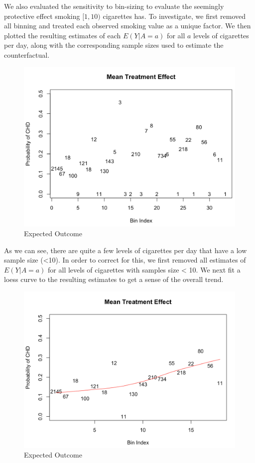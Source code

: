 \documentclass[]{article}
\begin{document}
We also evaluated the sensitivity to bin-sizing to evaluate the
seemingly protective effect smoking \([1, 10)\) cigarettes has. To
investigate, we first removed all binning and treated each observed
smoking value as a unique factor. We then plotted the resulting
estimates of each \(E(Y | A=a)\) for all \(a\) levels of cigarettes per
day, along with the corresponding sample sizes used to estimate the
counterfactual.

\begin{figure}[H]

{\centering \includegraphics[width=0.5\linewidth]{./effect} 

}

\caption{Expected Outcome}\label{fig:fig5}
\end{figure}

As we can see, there are quite a few levels of cigarettes per day that
have a low sample size (\textless{}10). In order to correct for this, we
first removed all estimates of \(E(Y | A=a )\) for all levels of
cigarettes with samples size \textless{} 10. We next fit a loess curve
to the resulting estimates to get a sense of the overall trend.

\begin{figure}[H]

{\centering \includegraphics[width=0.5\linewidth]{./pos_violation2} 

}

\caption{Expected Outcome}\label{fig:fig6}
\end{figure}
\end{document}
